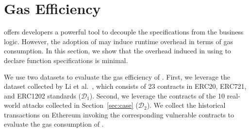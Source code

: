 \section{Gas Efficiency} \label{sec:perf}
\label{sec:eval}






\lang offers developers a powerful tool to decouple the specifications from the business logic.
However, the adoption of \lang may induce runtime overhead in terms of gas consumption.
In this section,
we show that the overhead induced in using \lang to declare function specifications is minimal.

We use two datasets to evaluate the gas efficiency of \lang.
First, we leverage the dataset collected by Li et al.~\cite{DBLP:conf/pldi/LiCL20}, which consists of 23 contracts in ERC20, ERC721, and ERC1202 standards ($\mathcal{D}_1$).
Second, we leverage the contracts of the 10 real-world attacks collected in Section~\ref{sec:case} ($\mathcal{D}_2$).
We collect the historical transactions on Ethereum invoking the corresponding vulnerable 
contracts to evaluate the gas consumption of \lang.

